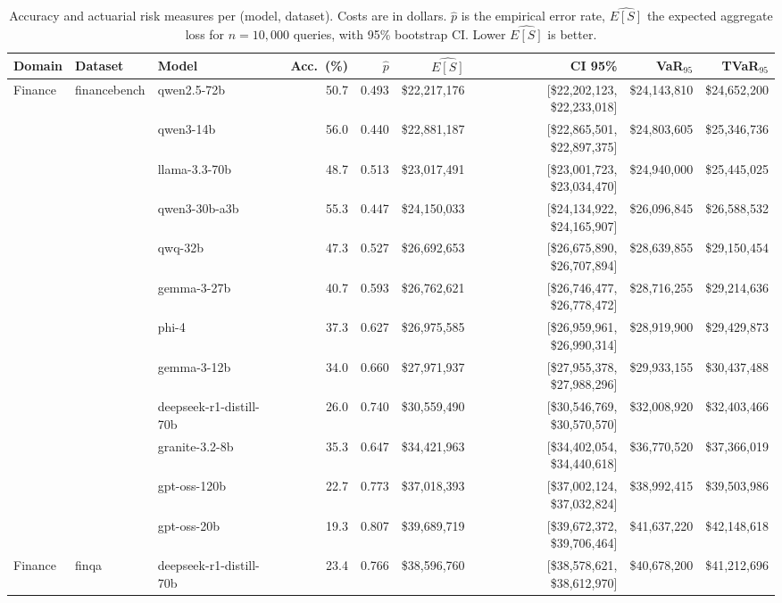 \begin{table}[t]
\centering\footnotesize
\caption{Accuracy and actuarial risk measures per (model, dataset).
Costs are in dollars. $\hat{p}$ is the empirical error rate, $\widehat{E[S]}$ the
expected aggregate loss for $n{=}10{,}000$ queries, with 95\% bootstrap CI.
Lower $\widehat{E[S]}$ is better.}
\label{tab:main-results}
\begin{tabular}{lllrrrrrr}
\toprule
Domain & Dataset & Model & Acc.~(\%) & $\hat{p}$ & $\widehat{E[S]}$ & CI 95\% & VaR$_{95}$ & TVaR$_{95}$ \\
\midrule
  Finance & financebench & qwen2.5-72b & 50.7 & 0.493 & \$22,217,176 & [\$22,202,123, \$22,233,018] & \$24,143,810 & \$24,652,200 \\
   &  & qwen3-14b & 56.0 & 0.440 & \$22,881,187 & [\$22,865,501, \$22,897,375] & \$24,803,605 & \$25,346,736 \\
   &  & llama-3.3-70b & 48.7 & 0.513 & \$23,017,491 & [\$23,001,723, \$23,034,470] & \$24,940,000 & \$25,445,025 \\
   &  & qwen3-30b-a3b & 55.3 & 0.447 & \$24,150,033 & [\$24,134,922, \$24,165,907] & \$26,096,845 & \$26,588,532 \\
   &  & qwq-32b & 47.3 & 0.527 & \$26,692,653 & [\$26,675,890, \$26,707,894] & \$28,639,855 & \$29,150,454 \\
   &  & gemma-3-27b & 40.7 & 0.593 & \$26,762,621 & [\$26,746,477, \$26,778,472] & \$28,716,255 & \$29,214,636 \\
   &  & phi-4 & 37.3 & 0.627 & \$26,975,585 & [\$26,959,961, \$26,990,314] & \$28,919,900 & \$29,429,873 \\
   &  & gemma-3-12b & 34.0 & 0.660 & \$27,971,937 & [\$27,955,378, \$27,988,296] & \$29,933,155 & \$30,437,488 \\
   &  & deepseek-r1-distill-70b & 26.0 & 0.740 & \$30,559,490 & [\$30,546,769, \$30,570,570] & \$32,008,920 & \$32,403,466 \\
   &  & granite-3.2-8b & 35.3 & 0.647 & \$34,421,963 & [\$34,402,054, \$34,440,618] & \$36,770,520 & \$37,366,019 \\
   &  & gpt-oss-120b & 22.7 & 0.773 & \$37,018,393 & [\$37,002,124, \$37,032,824] & \$38,992,415 & \$39,503,986 \\
   &  & gpt-oss-20b & 19.3 & 0.807 & \$39,689,719 & [\$39,672,372, \$39,706,464] & \$41,637,220 & \$42,148,618 \\
\midrule
  Finance & finqa & deepseek-r1-distill-70b & 23.4 & 0.766 & \$38,596,760 & [\$38,578,621, \$38,612,970] & \$40,678,200 & \$41,212,696 \\

\end{tabular}
\end{table}
